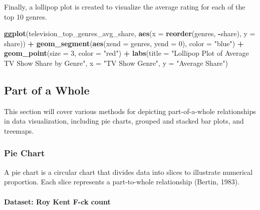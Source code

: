 \documentclass[
]{book}
\newenvironment{Shaded}{\begin{snugshade}}{\end{snugshade}}
\newcommand{\AttributeTok}[1]{\textcolor[rgb]{0.13,0.29,0.53}{#1}}
\newcommand{\DecValTok}[1]{\textcolor[rgb]{0.00,0.00,0.81}{#1}}
\newcommand{\FunctionTok}[1]{\textcolor[rgb]{0.13,0.29,0.53}{\textbf{#1}}}
\newcommand{\NormalTok}[1]{#1}
\newcommand{\SpecialCharTok}[1]{\textcolor[rgb]{0.81,0.36,0.00}{\textbf{#1}}}
\newcommand{\StringTok}[1]{\textcolor[rgb]{0.31,0.60,0.02}{#1}}
\begin{document}
Finally, a lollipop plot is created to visualize the average rating for each of the top 10 genres.

\begin{Shaded}
\begin{Highlighting}[]
\FunctionTok{ggplot}\NormalTok{(television\_top\_genres\_avg\_share, }\FunctionTok{aes}\NormalTok{(}\AttributeTok{x =} \FunctionTok{reorder}\NormalTok{(genres, }\SpecialCharTok{{-}}\NormalTok{share), }\AttributeTok{y =}\NormalTok{ share)) }\SpecialCharTok{+}
  \FunctionTok{geom\_segment}\NormalTok{(}\FunctionTok{aes}\NormalTok{(}\AttributeTok{xend =}\NormalTok{ genres, }\AttributeTok{yend =} \DecValTok{0}\NormalTok{), }\AttributeTok{color =} \StringTok{"blue"}\NormalTok{) }\SpecialCharTok{+}
  \FunctionTok{geom\_point}\NormalTok{(}\AttributeTok{size =} \DecValTok{3}\NormalTok{, }\AttributeTok{color =} \StringTok{"red"}\NormalTok{) }\SpecialCharTok{+}
  \FunctionTok{labs}\NormalTok{(}\AttributeTok{title =} \StringTok{"Lollipop Plot of Average TV Show Share by Genre"}\NormalTok{,}
       \AttributeTok{x =} \StringTok{"TV Show Genre"}\NormalTok{,}
       \AttributeTok{y =} \StringTok{"Average Share"}\NormalTok{)}
\end{Highlighting}
\end{Shaded}

\hypertarget{part-of-a-whole}{%
\subsection*{Part of a Whole}\label{part-of-a-whole}}

This section will cover various methods for depicting part-of-a-whole relationships in data visualization, including pie charts, grouped and stacked bar plots, and treemaps.

\hypertarget{pie-chart}{%
\subsubsection*{Pie Chart}\label{pie-chart}}

A pie chart is a circular chart that divides data into slices to illustrate numerical proportion. Each slice represents a part-to-whole relationship (Bertin, 1983).

\hypertarget{dataset-roy-kent-f-ck-count}{%
\paragraph{Dataset: Roy Kent F-ck count}\label{dataset-roy-kent-f-ck-count}}
\end{document}
